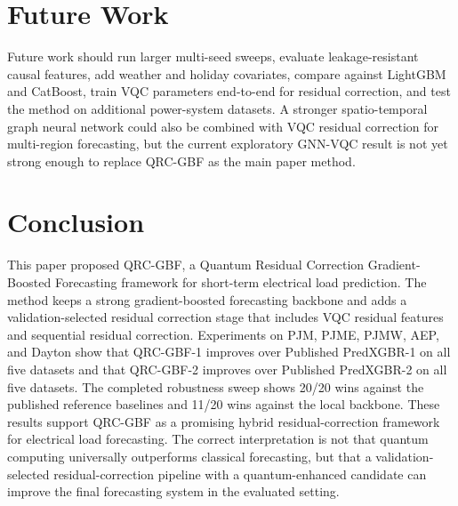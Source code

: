 \documentclass[11pt]{article}
\begin{document}
\section{Future Work}
Future work should run larger multi-seed sweeps, evaluate leakage-resistant causal features, add weather and holiday covariates, compare against LightGBM and CatBoost, train VQC parameters end-to-end for residual correction, and test the method on additional power-system datasets. A stronger spatio-temporal graph neural network could also be combined with VQC residual correction for multi-region forecasting, but the current exploratory GNN-VQC result is not yet strong enough to replace QRC-GBF as the main paper method.

\section{Conclusion}
This paper proposed QRC-GBF, a Quantum Residual Correction Gradient-Boosted Forecasting framework for short-term electrical load prediction. The method keeps a strong gradient-boosted forecasting backbone and adds a validation-selected residual correction stage that includes VQC residual features and sequential residual correction. Experiments on PJM, PJME, PJMW, AEP, and Dayton show that QRC-GBF-1 improves over Published PredXGBR-1 on all five datasets and that QRC-GBF-2 improves over Published PredXGBR-2 on all five datasets. The completed robustness sweep shows 20/20 wins against the published reference baselines and 11/20 wins against the local backbone. These results support QRC-GBF as a promising hybrid residual-correction framework for electrical load forecasting. The correct interpretation is not that quantum computing universally outperforms classical forecasting, but that a validation-selected residual-correction pipeline with a quantum-enhanced candidate can improve the final forecasting system in the evaluated setting.



\end{document}
